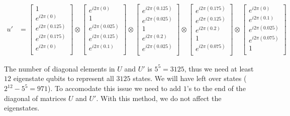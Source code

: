 \documentclass[msc,oneside]{ubcthesis}
\begin{document}
	\begin{align*}	
	u' & = \begin{bmatrix}
		1 \\
		e^{i2\pi(0)} \\
		e^{i2\pi(0.125)} \\
		e^{i2\pi(0.175)} \\
		e^{i2\pi(0)} \\
	\end{bmatrix} 
	\otimes \begin{bmatrix}
		e^{i2\pi(0)} \\
		1 \\
		e^{i2\pi(0.025)} \\
		e^{i2\pi(0.125)} \\
		e^{i2\pi(0.1)} \\
	\end{bmatrix}
	\otimes \begin{bmatrix}
		e^{i2\pi(0.125)} \\
		e^{i2\pi(0.025)} \\
		1\\
		e^{i2\pi(0.2)} \\
		e^{i2\pi(0.025)} \\
	\end{bmatrix} 
	\otimes \begin{bmatrix}
		e^{i2\pi(0.175)} \\
		e^{i2\pi(0.125)} \\
		e^{i2\pi(0.2)} \\
		1 \\
		e^{i2\pi(0.075)} \\
	\end{bmatrix} 
	\otimes \begin{bmatrix}
		e^{i2\pi(0)} \\
		e^{i2\pi(0.1)} \\
		e^{i2\pi(0.025)} \\
		e^{i2\pi(0.075)} \\
		1 \\
	\end{bmatrix} 							 			
\end{align*}
	

	
	The number of diagonal elements in $U$ and $U'$ is $5^5 = 3125$, thus we need at least $12$ eigenstate qubits to represent all $3125$ states. We will have left over states ($2^{12} - 5^5 = 971$). To accomodate this issue we need to add $1$'s to the end of the diagonal of matrices $U$ and $U'$. With this method, we do not affect the eigenstates.
	
\end{document}
